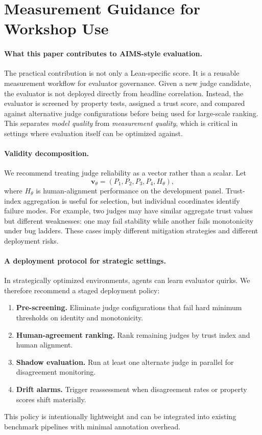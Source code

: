 \section{Measurement Guidance for Workshop Use}

\paragraph{What this paper contributes to AIMS-style evaluation.}
The practical contribution is not only a Lean-specific score.
It is a reusable measurement workflow for evaluator governance.
Given a new judge candidate, the evaluator is not deployed directly from headline correlation.
Instead, the evaluator is screened by property tests, assigned a trust score, and compared against alternative judge configurations before being used for large-scale ranking.
This separates \emph{model quality} from \emph{measurement quality}, which is critical in settings where evaluation itself can be optimized against.

\paragraph{Validity decomposition.}
We recommend treating judge reliability as a vector rather than a scalar.
Let
\[
\mathbf{v}_\theta = (P_1, P_2, P_3, P_4, H_\theta),
\]
where \(H_\theta\) is human-alignment performance on the development panel.
Trust-index aggregation is useful for selection, but individual coordinates identify failure modes.
For example, two judges may have similar aggregate trust values but different weaknesses:
one may fail stability while another fails monotonicity under bug ladders.
These cases imply different mitigation strategies and different deployment risks.

\paragraph{A deployment protocol for strategic settings.}
In strategically optimized environments, agents can learn evaluator quirks.
We therefore recommend a staged deployment policy:
\begin{enumerate}
\item \textbf{Pre-screening.} Eliminate judge configurations that fail hard minimum thresholds on identity and monotonicity.
\item \textbf{Human-agreement ranking.} Rank remaining judges by trust index and human alignment.
\item \textbf{Shadow evaluation.} Run at least one alternate judge in parallel for disagreement monitoring.
\item \textbf{Drift alarms.} Trigger reassessment when disagreement rates or property scores shift materially.
\end{enumerate}
This policy is intentionally lightweight and can be integrated into existing benchmark pipelines with minimal annotation overhead.

